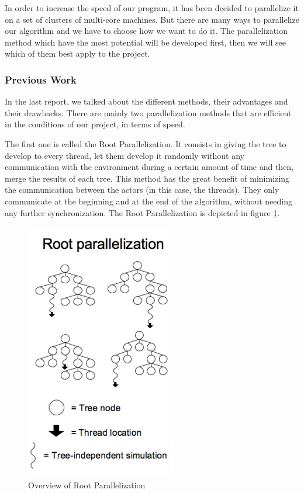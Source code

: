In order to increase the speed of our program, it has been decided to parallelize it on a set of clusters of multi-core machines. But there are many ways to parallelize our algorithm and we have to choose how we want to do it. The parallelization method which have the most potential will be developed first, then we will see which of them best apply to the project.
\subsubsection{Previous Work}
In the last report, we talked about the different methods, their advantages and their drawbacks. There are mainly two parallelization methods that are efficient in the conditions of our project, in terms of speed.

The first one is called the Root Parallelization. It consists in giving the tree to develop to every thread, let them develop it randomly without any communication with the environment
during a certain amount of time and then, merge the results of each tree.
This method has the great benefit of minimizing the communication between the actors (in this case, the threads).
They only communicate at the beginning and at the end of the algorithm, without needing any further synchronization. The Root Parallelization is depicted in figure \ref{fig:root}.

\begin{figure}[!ht] 
\centerline{\includegraphics[scale=0.60]{3Methods/3.1Parallelization_Method/root.png}}
   \caption{Overview of Root Parallelization}
\label{fig:root}
\end{figure}

